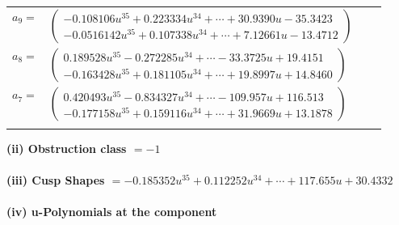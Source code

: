 \documentclass[1p]{elsarticle_modified}
\theoremstyle{definition}
\begin{document}
\begin{tabular}{m{7pt} m{180pt} m{7pt} m{180pt} }
\flushright $a_{9}=$&$\begin{pmatrix}-0.108106 u^{35}+0.223334 u^{34}+\cdots+30.9390 u-35.3423\\-0.0516142 u^{35}+0.107338 u^{34}+\cdots+7.12661 u-13.4712\end{pmatrix}$ \\
\flushright $a_{8}=$&$\begin{pmatrix}0.189528 u^{35}-0.272285 u^{34}+\cdots-33.3725 u+19.4151\\-0.163428 u^{35}+0.181105 u^{34}+\cdots+19.8997 u+14.8460\end{pmatrix}$ \\
\flushright $a_{7}=$&$\begin{pmatrix}0.420493 u^{35}-0.834327 u^{34}+\cdots-109.957 u+116.513\\-0.177158 u^{35}+0.159116 u^{34}+\cdots+31.9669 u+13.1878\end{pmatrix}$\\&\end{tabular}
\flushleft \textbf{(ii) Obstruction class $= -1$}\\~\\
\flushleft \textbf{(iii) Cusp Shapes $= -0.185352 u^{35}+0.112252 u^{34}+\cdots+117.655 u+30.4332$}\\~\\
\newpage\renewcommand{\arraystretch}{1}
\flushleft \textbf{(iv) u-Polynomials at the component}\newline \\
\end{document}
